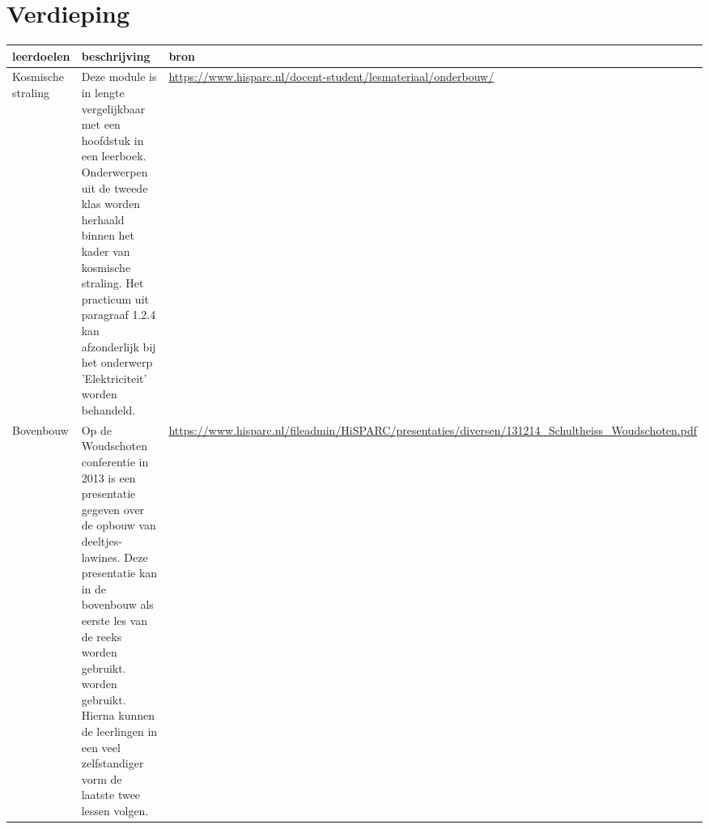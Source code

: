 \section{Verdieping}

\begin{tabular}{ |>{\raggedright}p{2.5cm}|>{\raggedright}p{8cm}|>{\raggedright}p{4cm}|}
\hline
leerdoelen & beschrijving & bron \tabularnewline
\hline
Kosmische straling &
Deze module is in lengte vergelijkbaar met een hoofdstuk in een leerboek. Onderwerpen uit de tweede klas worden herhaald binnen het kader van kosmische straling. Het practicum uit paragraaf 1.2.4 kan afzonderlijk bij het onderwerp 'Elektriciteit' worden behandeld. &
\url{https://www.hisparc.nl/docent-student/lesmateriaal/onderbouw/} \tabularnewline
\hline
Bovenbouw &
Op de Woudschoten conferentie in 2013 is een presentatie gegeven over de opbouw van deeltjes-lawines. Deze presentatie kan in de bovenbouw als eerste les van de reeks worden gebruikt. worden gebruikt. Hierna kunnen de leerlingen in een veel zelfstandiger vorm de laatste twee lessen volgen. &
\url{https://www.hisparc.nl/fileadmin/HiSPARC/presentaties/diversen/131214_Schultheiss_Woudschoten.pdf} \tabularnewline
\hline
\end{tabular}


